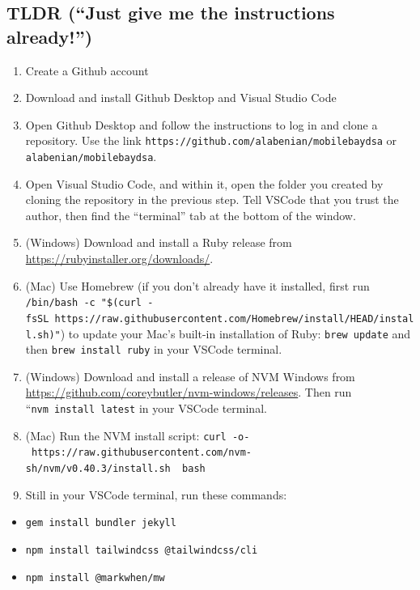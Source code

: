 \documentclass[
]{book}
\providecommand{\tightlist}{%
  \setlength{\itemsep}{0pt}\setlength{\parskip}{0pt}}
\begin{document}
\subsection{TLDR (``Just give me the instructions already!'')}\label{tldr-just-give-me-the-instructions-already}

\begin{enumerate}
\def\labelenumi{\arabic{enumi}.}
\tightlist
\item
  Create a Github account
\item
  Download and install Github Desktop and Visual Studio Code
\item
  Open Github Desktop and follow the instructions to log in and clone a repository. Use the link \texttt{https://github.com/alabenian/mobilebaydsa} or \texttt{alabenian/mobilebaydsa}.
\item
  Open Visual Studio Code, and within it, open the folder you created by cloning the repository in the previous step. Tell VSCode that you trust the author, then find the ``terminal'' tab at the bottom of the window.
\item
  (Windows) Download and install a Ruby release from \url{https://rubyinstaller.org/downloads/}.
\item
  (Mac) Use Homebrew (if you don't already have it installed, first run \texttt{/bin/bash\ -c\ "\$(curl\ -fsSL\ https://raw.githubusercontent.com/Homebrew/install/HEAD/install.sh)"}) to update your Mac's built-in installation of Ruby: \texttt{brew\ update} and then \texttt{brew\ install\ ruby} in your VSCode terminal.
\item
  (Windows) Download and install a release of NVM Windows from \url{https://github.com/coreybutler/nvm-windows/releases}. Then run ``\texttt{nvm\ install\ latest} in your VSCode terminal.
\item
  (Mac) Run the NVM install script: \texttt{curl\ -o-\ https://raw.githubusercontent.com/nvm-sh/nvm/v0.40.3/install.sh\ \textbar{}\ bash}
\item
  Still in your VSCode terminal, run these commands:
\end{enumerate}

\begin{itemize}
\tightlist
\item
  \texttt{gem\ install\ bundler\ jekyll}
\item
  \texttt{npm\ install\ tailwindcss\ @tailwindcss/cli}
\item
  \texttt{npm\ install\ @markwhen/mw}
\end{itemize}
\end{document}
